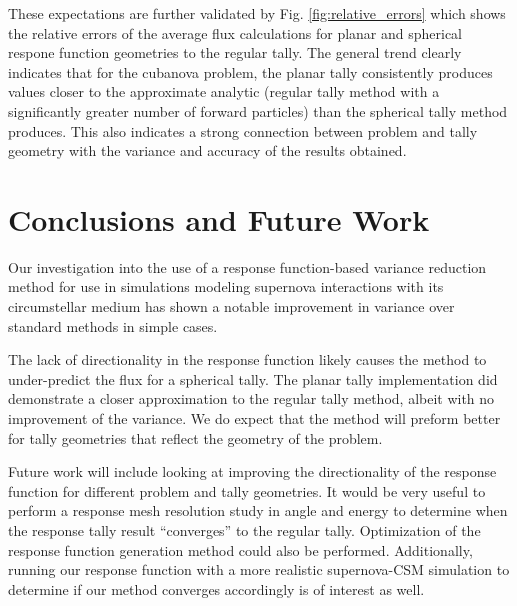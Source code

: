 \documentclass[]{article}
\begin{document}
		These expectations are further validated by Fig. \ref{fig:relative_errors} which shows the relative errors of the average flux calculations for planar and spherical respone function geometries to the regular tally. The general trend clearly indicates that for the cubanova problem, the planar tally consistently produces values closer to the approximate analytic (regular tally method with a significantly greater number of forward particles) than the spherical tally method produces. This also indicates a strong connection between problem and tally geometry with the variance and accuracy of the results obtained. 

\section{Conclusions and Future Work}
Our investigation into the use of a response function-based variance reduction method for use in simulations modeling supernova interactions with its circumstellar medium has shown a notable improvement in variance over standard methods in simple cases. 

The lack of directionality in the response function likely causes the method to under-predict the flux for a spherical tally. The planar tally implementation did demonstrate a closer approximation to the regular tally method, albeit with no improvement of the variance. We do expect that the method will preform better for tally geometries that reflect the geometry of the problem.

Future work will include looking at improving the directionality of the response function for different problem and tally geometries. It would be very useful to perform a response mesh resolution study in angle and energy to determine when the response tally result ``converges'' to the regular tally. Optimization of the response function generation method could also be performed. Additionally, running our response function with a more realistic supernova-CSM simulation to determine if our method converges accordingly is of interest as well.

\newpage

%
%
\end{document}
